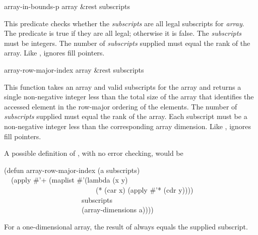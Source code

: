\begin{defun}[Function]
array-in-bounds-p array &rest subscripts

This predicate checks whether the \emph{subscripts} are all
legal subscripts for \emph{array}.  The predicate is true if they
are all legal; otherwise it is false.  The \emph{subscripts} must be integers.
The number of \emph{subscripts} supplied must equal the rank of the array.
Like ,  ignores fill pointers.
\end{defun}

\begin{defun}[Function]
array-row-major-index array &rest subscripts

This function takes an array and valid subscripts for the array
and returns a single non-negative integer less than the total size
of the array that identifies the
accessed element in the row-major ordering of the elements.
The number of \emph{subscripts} supplied must equal the rank of the array.
Each subscript must be a non-negative integer less than the
corresponding array dimension.
Like ,  ignores fill pointers.

A possible definition of , with no error checking,
would be
\begin{lisp}
(defun array-row-major-index (a  subscripts) \\
~~(apply \#'+ (maplist \#'(lambda (x y) \\
~~~~~~~~~~~~~~~~~~~~~~~~~~(* (car x) (apply \#'* (cdr y)))) \\
~~~~~~~~~~~~~~~~~~~~~~subscripts \\
~~~~~~~~~~~~~~~~~~~~~~(array-dimensions a))))
\end{lisp}
For a one-dimensional array, the result of 
always equals the supplied subscript.
\end{defun}

